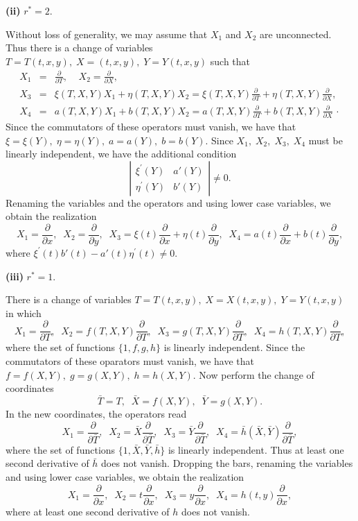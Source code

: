 {\bf (ii)} $r^{*}=2.$

Without loss of generality, we may assume that $X_1$ and $X_2$ are 
unconnected. Thus there is a change of variables $T=T(t,x,y),\;X=(t,x,y),\;   
Y=Y(t,x,y)$ such that
\begin{eqnarray*}
X_1 &=& \frac{\partial }{\partial T},\;\;\;\;
X_2=\frac{\partial}{\partial X},\\
X_3 & =& \xi (T,X,Y)X_1+\eta (T,X,Y)X_2=
\xi (T,X,Y) \frac{\partial}{\partial T}+\eta (T,X,Y)\frac{\partial}
{\partial X}, \\
X_4 &=& a(T,X,Y)X_1+b(T,X,Y)X_2=
a(T,X,Y) \frac{\partial}{\partial T}+b (T,X,Y)\frac{\partial}
{\partial X}\,\cdot 
\end{eqnarray*}
Since the commutators of these operators must vanish, we have that
$\xi=\xi(Y),\;\eta=\eta (Y),\;a=a(Y),\;b=b(Y)$.
Since $X_1,\; X_2,\;X_3,\; X_4$ must be
linearly independent, we have the additional condition
\[\left | \begin{array}{cc}
\xi^{'}(Y) & a'(Y)\\
\eta^{'}(Y) & b'(Y) 
\end{array}\right |\ne 0.\]
Renaming the variables and the operators and using lower case variables, 
we obtain the realization
\begin{equation}
\label{ch6:eq6}
X_1=\frac{\partial}{\partial x},\;\; X_2=\frac{\partial}{\partial y},\;\;
X_3=\xi (t) \frac{\partial }{\partial x}+\eta (t)\frac{\partial}{\partial y}
,\;\; X_4=a(t) \frac{\partial }{\partial x}+b(t)\frac{\partial}{\partial y},
\end{equation}
where $\xi^{'}(t)b'(t)-a'(t)\eta^{'}(t)\ne 0$.

{\bf (iii)} $r^{*}=1.$

There is a change of variables $T=T(t,x,y),\;X=X(t,x,y),\;Y=Y(t,x,y)$
in which
\[X_1=\frac{\partial}{\partial T},\;\;X_2=f(T,X,Y)\frac{\partial}{\partial T}
,\;\;X_3=g(T,X,Y)\frac{\partial}{\partial T},\;\;
X_4=h(T,X,Y)\frac{\partial}{\partial T},\]
where the set of functions $\{1,f,g,h\}$ is linearly independent. 
Since the commutators of these oparators must vanish, we have that
$f=f(X,Y),\;g=g(X,Y),\;h=h(X,Y)$.
Now perform the change of coordinates
\[\bar T=T,\;\;\bar X=f(X,Y),\;\;\bar Y=g(X,Y).\]
In the new coordinates, the operators read
\[X_1=\frac{\partial}{\partial \bar T},\;\;
X_2=\bar X \frac{\partial}{\partial \bar T}
,\;\;X_3=\bar Y\frac{\partial}{\partial \bar T},\;\;
X_4=\bar h(\bar X,\bar Y)\frac{\partial}{\partial \bar T},\]
where the set of functions $\{1, \bar X, \bar Y, \bar h\}$ is linearly 
independent. Thus at least one second derivative of $\bar h$ does not
vanish. Dropping the bars, renaming the variables and using lower case 
variables, we obtain the realization
\begin{equation}
X_1=\frac{\partial}{\partial x},\;\; X_2=t\frac{\partial}{\partial x},\;\;
X_3=y\frac{\partial}{\partial x},\;\;X_4=h(t,y)\frac{\partial}{\partial x},
\label{ch6:eq7}
\end{equation}
where  at least one second derivative of $h$ does not vanish.  

